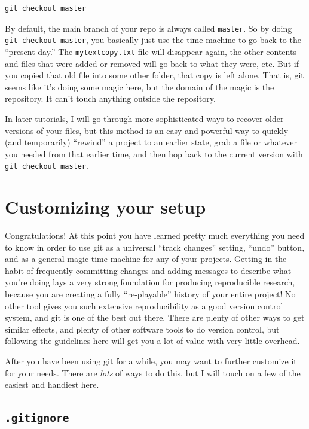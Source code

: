 \documentclass[11pt]{article}
\begin{document}
\begin{verbatim}
git checkout master
\end{verbatim}

By default, the main branch of your repo is always called \texttt{master}. So by doing \texttt{git checkout master}, you basically just use the time machine to go back to the ``present day.'' The \texttt{mytextcopy.txt} file will disappear again, the other contents and files that were added or removed will go back to what they were, etc.  But if you copied that old file into some other folder, that copy is left alone.  That is, git seems like it's doing some magic here, but the domain of the magic is the repository.  It can't touch anything outside the repository.

In later tutorials, I will go through more sophisticated ways to recover older versions of your files, but this method is an easy and powerful way to quickly (and temporarily) ``rewind'' a project to an earlier state, grab a file or whatever you needed from that earlier time, and then hop back to the current version with \texttt{git checkout master}.
\section{Customizing your setup}
\label{sec-10}

Congratulations! At this point you have learned pretty much everything you need to know in order to use git as a universal ``track changes'' setting, ``undo'' button, and as a general magic time machine for any of your projects.  Getting in the habit of frequently committing changes and adding messages to describe what you're doing lays a very strong foundation for producing reproducible research, because you are creating a fully ``re-playable'' history of your entire project!  No other tool gives you such extensive reproducibility as a good version control system, and git is one of the best out there. There are plenty of other ways to get similar effects, and plenty of other software tools to do version control, but following the guidelines here will get you a lot of value with very little overhead.

After you have been using git for a while, you may want to further customize it for your needs.  There are \emph{lots} of ways to do this, but I will touch on a few of the easiest and handiest here.
\subsection{\texttt{.gitignore}}
\label{sec-10-1}
\end{document}
